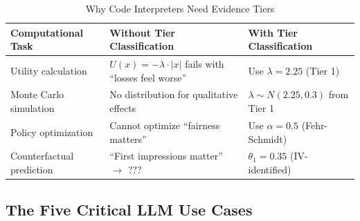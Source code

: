 \documentclass[11pt, a4paper]{article}
\begin{document}
\begin{table}[htbp]
\centering
\caption{Why Code Interpreters Need Evidence Tiers}
\label{tab:evd-code-interpreter}
\renewcommand{\arraystretch}{1.3}
\begin{tabular}{@{}p{3.5cm}p{5cm}p{4.5cm}@{}}
\toprule
\textbf{Computational Task} & \textbf{Without Tier Classification} & \textbf{With Tier Classification} \\
\midrule
Utility calculation & $U(x) = -\lambda \cdot |x|$ fails with ``losses feel worse'' & Use $\lambda = 2.25$ (Tier 1) \\
Monte Carlo simulation & No distribution for qualitative effects & $\lambda \sim N(2.25, 0.3)$ from Tier 1 \\
Policy optimization & Cannot optimize ``fairness matters'' & Use $\alpha = 0.5$ (Fehr-Schmidt) \\
Counterfactual prediction & ``First impressions matter'' $\to$ ??? & $\theta_1 = 0.35$ (IV-identified) \\
\bottomrule
\end{tabular}
\end{table}

\subsection{The Five Critical LLM Use Cases}
\end{document}
